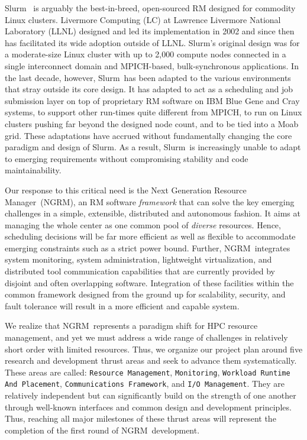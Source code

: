 \documentclass[10pt]{article}
\newcommand{\ngrm}{NGRM}
\newcommand{\ngrmfull}{Next Generation Resource Manager}
\newcommand{\slurm}{Slurm}
\newcommand{\moab}{Moab}
\begin{document}

\slurm~\cite{SlurmDesign} is arguably the
best-in-breed, open-sourced RM designed for commodity Linux clusters.
Livermore Computing (LC) at Lawrence Livermore National Laboratory (LLNL)
designed and led its implementation in 2002 and since then has facilitated
its wide adoption outside of LLNL.
\slurm's original design was for a moderate-size Linux cluster with up to 2,000 
compute nodes connected in a single interconnect domain and MPICH-based, 
bulk-synchronous applications.
In the last decade, however, \slurm\ has been adapted to the various
environments that stray outside its core design.
It has adapted to act as a scheduling and job submission layer
on top of proprietary RM software on IBM Blue Gene and Cray systems,
to support other run-times quite different from MPICH,
to run on Linux clusters pushing far beyond the designed node count,
and to be tied into a \moab~\cite{MOAB:online} grid.
These adaptations have accrued without fundamentally changing the
core paradigm and design of \slurm. As a result, \slurm\ is increasingly
unable to adapt to emerging requirements without compromising
stability and code maintainability.

Our response to this critical need is the \ngrmfull\ (\ngrm ), an RM software
{\em framework} that can solve the key emerging challenges 
in a simple, extensible, distributed and autonomous fashion.
It aims at managing the whole center as one common pool of {\em diverse} 
resources. Hence, scheduling decisions will be 
far more efficient as well as flexible to accommodate 
emerging constraints such as a strict power bound. 
Further, \ngrm\ integrates
system monitoring, system administration, lightweight
virtualization, and distributed tool communication capabilities
that are currently provided by disjoint and often overlapping software.
Integration of these facilities within the common framework designed from
the ground up for scalability, security, and fault tolerance will result
in a more efficient and capable system.


We realize that \ngrm\ represents a paradigm shift for HPC resource management, 
and yet we must address a wide range of challenges in relatively short order
with limited resources. Thus, we 
organize our project plan around five research and development thrust areas 
and seek to advance them systematically.
These areas are called:
{\tt Resource Management},
{\tt Monitoring},
{\tt Workload Runtime And Placement}, 
{\tt Communications Framework}, and
{\tt I/O Management}.
They are relatively independent but can significantly build on the
strength of one another through well-known interfaces and common design
and development principles.
Thus, reaching all major milestones of these thrust areas 
will represent the completion of the first round of \ngrm\ development. 
\end{document}
